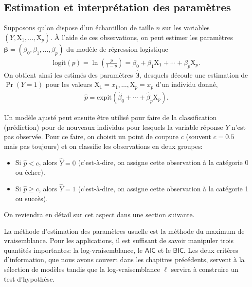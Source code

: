 \documentclass[
  11pt,
  letterpaper,
]{book}
\providecommand{\tightlist}{%
  \setlength{\itemsep}{0pt}\setlength{\parskip}{0pt}}\usepackage{longtable,booktabs,array}
\theoremstyle{definition}
\theoremstyle{remark}
\begin{document}
\hypertarget{estimation-et-interpruxe9tation-des-paramuxe8tres}{%
\subsection{Estimation et interprétation des
paramètres}\label{estimation-et-interpruxe9tation-des-paramuxe8tres}}

Supposons qu'on dispose d'un échantillon de taille \(n\) sur les
variables \((Y, \mathrm{X}_1, \ldots, \mathrm{X}_p)\). À l'aide de ces
observations, on peut estimer les paramètres
\(\boldsymbol{\beta} = (\beta_0, \beta_1 ,\ldots, \beta_p)\) du modèle
de régression logistique \begin{align*}
\textrm{logit}(p) = \ln \left( \frac{p}{1-p}\right) = \beta_0 + \beta_1 \mathrm{X}_1 + \cdots + \beta_p\mathrm{X}_p.
\end{align*} On obtient ainsi les estimés des paramètres
\(\widehat{\boldsymbol{\beta}}\), desquels découle une estimation de
\(\Pr(Y=1)\) pour les valeurs
\(\mathrm{X}_1=x_1, \ldots, \mathrm{X}_p=x_p\) d'un individu donné,
\begin{align*}
 \widehat{p} = \textrm{expit}(\widehat{\beta}_0 + \cdots + \widehat{\beta}_p\mathrm{X}_p).
\end{align*}

Un modèle ajusté peut ensuite être utilisé pour faire de la
classification (prédiction) pour de nouveaux individus pour lesquels la
variable réponse \(Y\) n'est pas observée. Pour ce faire, on choisit un
point de coupure \(c\) (souvent \(c=0.5\) mais pas toujours) et on
classifie les observations en deux groupes:

\begin{itemize}
\tightlist
\item
  Si \(\widehat{p}< c\), alors \(\widehat{Y}=0\) (c'est-à-dire, on
  assigne cette observation à la catégorie 0 ou échec).
\item
  Si \(\widehat{p} \geq c\), alors \(\widehat{Y}=1\) (c'est-à-dire, on
  assigne cette observation à la catégorie 1 ou succès).
\end{itemize}

On reviendra en détail sur cet aspect dans une section suivante.

La méthode d'estimation des paramètres usuelle est la méthode du maximum
de vraisemblance. Pour les applications, il est suffisant de savoir
manipuler trois quantités importantes: la log-vraisemblance, le
\(\mathsf{AIC}\) et le \(\mathsf{BIC}\). Les deux critères
d'information, que nous avons couvert dans les chapitres précédents,
servent à la sélection de modèles tandis que la log-vraisemblance
\(\ell\) servira à construire un test d'hypothèse.
\end{document}
